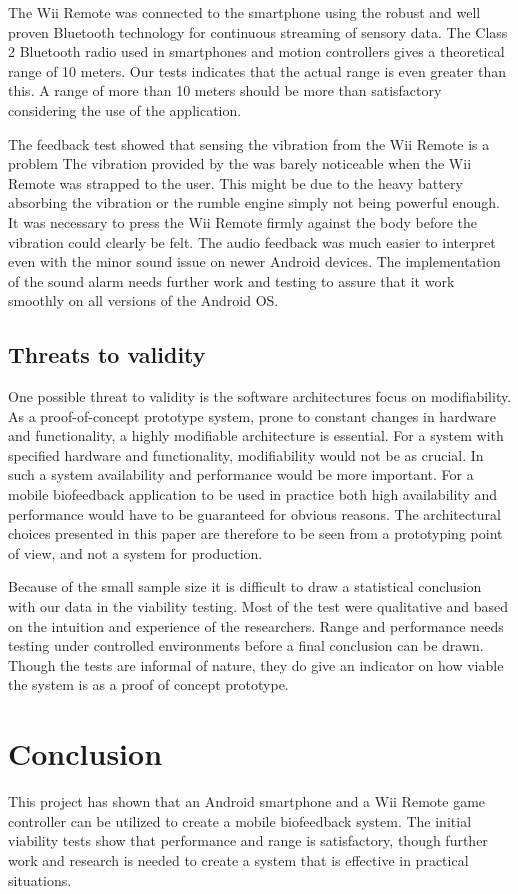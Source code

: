 The Wii Remote was connected to the smartphone using the robust and well proven Bluetooth technology for continuous streaming of sensory data. The Class 2 Bluetooth radio used in smartphones and motion controllers gives a theoretical range of 10 meters. Our tests indicates that the actual range is even greater than this. A range of more than 10 meters should be more than satisfactory considering the use of the application.

The feedback test showed that sensing the vibration from the Wii Remote is a problem
The vibration provided by the was barely noticeable when the Wii Remote was strapped to the user. This might be due to the heavy battery absorbing the vibration or the rumble engine simply not being powerful enough. It was necessary to press the Wii Remote firmly against the body before the vibration could clearly be felt. The audio feedback was much easier to interpret even with the minor sound issue on newer Android devices. The implementation of the sound alarm needs further work and testing to assure that it work smoothly on all versions of the Android OS.

\subsection{Threats to validity}
One possible threat to validity is the software architectures focus on modifiability. As a proof-of-concept prototype system, prone to constant changes in hardware and functionality, a highly modifiable architecture is essential. For a system with specified hardware and functionality, modifiability would not be as crucial. In such a system availability and performance would be more important. For a mobile biofeedback application to be used in practice both high availability and performance would have to be guaranteed for obvious reasons. The architectural choices presented in this paper are therefore to be seen from a prototyping point of view, and not a system for production.

Because of the small sample size it is difficult to draw a statistical conclusion with our data in the viability testing. Most of the test were qualitative and based on the intuition and experience of the researchers. Range and performance needs testing under controlled environments before a final conclusion can be drawn. Though the tests are informal of nature, they do give an indicator on how viable the system is as a proof of concept prototype. 

\section{Conclusion}
This project has shown that an Android smartphone and a Wii Remote game controller can be utilized to create a mobile biofeedback system. The initial viability tests show that performance and range is satisfactory, though further work and research is needed to create a system that is effective in practical situations.

